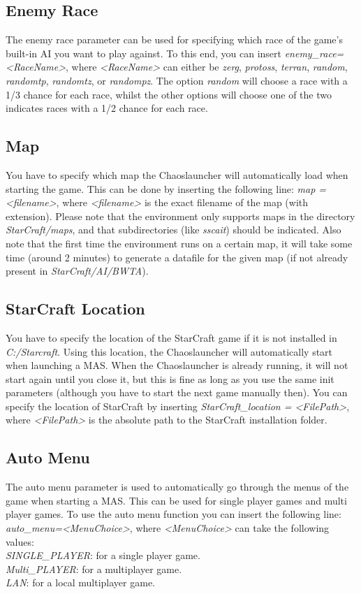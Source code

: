 \subsection{Enemy Race}
\label{enemy race}
The enemy race parameter can be used for specifying which race of the game's built-in AI you want to play against. To this end, you can insert \textit{enemy\_race=<RaceName>}, where \textit{<RaceName>} can either be \textit{zerg}, \textit{protoss}, \textit{terran}, \textit{random}, \textit{randomtp}, \textit{randomtz}, or \textit{randompz}. The option \textit{random} will choose a race with a 1/3 chance for each race, whilst the other options will choose one of the two indicates races with a 1/2 chance for each race.

\subsection{Map}
\label{map}
You have to specify which map the Chaoslauncher will automatically load when starting the game. This can be done by inserting the following line: \textit{map = <filename>}, where \textit{<filename>} is the exact filename of the map (with extension). Please note that the environment only supports maps in the directory \textit{StarCraft/maps}, and that subdirectories (like \textit{sscait}) should be indicated. Also note that the first time the environment runs on a certain map, it will take some time (around 2 minutes) to generate a datafile for the given map (if not already present in \textit{StarCraft/AI/BWTA}).

\subsection{StarCraft Location}
\label{StarCraft location}
You have to specify the location of the StarCraft game if it is not installed in \textit{C:/Starcraft}. Using this location, the Chaoslauncher will automatically start when launching a MAS. When the Chaoslauncher is already running, it will not start again until you close it, but this is fine as long as you use the same init parameters (although you have to start the next game manually then). You can specify the location of StarCraft by inserting \textit{StarCraft\_location = <FilePath>}, where \textit{<FilePath>} is the absolute path to the StarCraft installation folder.

\subsection{Auto Menu}
\label{auto menu}
The auto menu parameter is used to automatically go through the menus of the game when starting a MAS. This can be used for single player games and multi player games. To use the auto menu function you can insert the following line: \textit{auto\_menu=<MenuChoice>}, where \textit{<MenuChoice>} can take the following values:\\
\textit{SINGLE\_PLAYER}: for a single player game.\\
\textit{Multi\_PLAYER}: for a multiplayer game.\\
\textit{LAN}: for a local multiplayer game.

